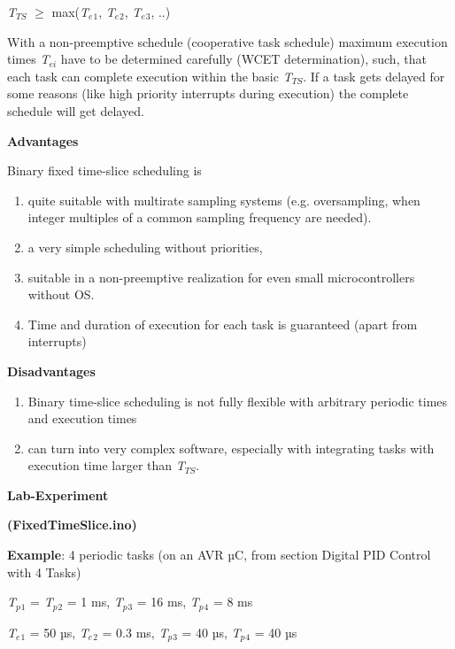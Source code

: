 \textit{   T${}_{TS}$} $\mathrm{\ge}$ max(\textit{T${}_{e}$}${}_{1}$,\textit{ T${}_{e}$}${}_{2}$,\textit{ T${}_{e}$}${}_{3}$, ..)

With a non-preemptive schedule (cooperative task schedule) maximum execution times \textit{T${}_{ei}$} have to be determined carefully (WCET determination), such, that each task can complete execution within the basic \textit{T${}_{TS}$}. If a task gets delayed for some reasons (like high priority interrupts during execution) the complete schedule will get delayed.

\textbf{Advantages }

Binary fixed time-slice scheduling is

\begin{enumerate}
	\item  quite suitable with multirate sampling systems (e.g. oversampling, when integer multiples of a common sampling frequency are needed).
	\item  a very simple scheduling without priorities,
	\item  suitable in a non-preemptive realization for even small microcontrollers without OS. 
	\item  Time and duration of execution for each task is guaranteed (apart from interrupts)
\end{enumerate}

\textbf{Disadvantages }

\begin{enumerate}
	\item \textbf{ }Binary time-slice scheduling is not fully flexible with arbitrary periodic times and execution times
	\item  can turn into very complex software, especially with integrating tasks with execution time larger than \textit{T${}_{TS}$}.
\end{enumerate}



\textbf{Lab-Experiment}   \textbf{}

\textbf{  (FixedTimeSlice.ino)}

\textbf{Example}: 4 periodic tasks (on an AVR µC, from section Digital PID Control with 4 Tasks) 

\textit{T${}_{p}$}${}_{1}$ = \textit{T${}_{p}$}${}_{2}$ = 1 ms, \textit{T${}_{p}$}${}_{3}$ = 16 ms, \textit{T${}_{p}$}${}_{4}$ = 8 ms

\textit{T${}_{e}$}${}_{1}$ = 50 µs, \textit{T${}_{e}$}${}_{2}$ = 0.3 ms, \textit{T${}_{p}$}${}_{3}$ = 40 µs, \textit{T${}_{p}$}${}_{4}$ = 40 µs

